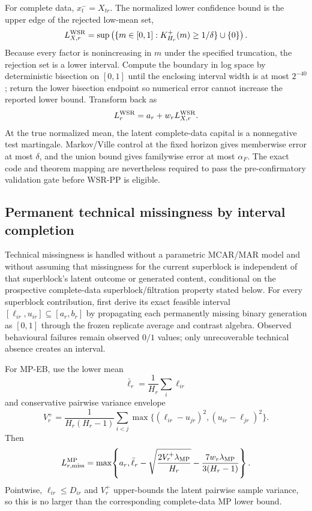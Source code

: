 \documentclass[11pt,a4paper]{article}
\begin{document}
For complete data, $x_t^-=X_{tr}$. The normalized lower confidence bound is the upper edge of the rejected low-mean set,
\[
L_{X,r}^{\rm WSR}
=\sup\left(\{m\in[0,1]:K_{H_r}^+(m)\ge1/\delta\}\cup\{0\}\right).
\]
Because every factor is nonincreasing in $m$ under the specified truncation, the rejection set is a lower interval. Compute the boundary in log space by deterministic bisection on $[0,1]$ until the enclosing interval width is at most $2^{-40}$; return the lower bisection endpoint so numerical error cannot increase the reported lower bound. Transform back as
\[
L_r^{\rm WSR}=a_r+w_rL_{X,r}^{\rm WSR}.
\]
At the true normalized mean, the latent complete-data capital is a nonnegative test martingale. Markov/Ville control at the fixed horizon gives memberwise error at most $\delta$, and the union bound gives familywise error at most $\alpha_F$. The exact code and theorem mapping are nevertheless required to pass the pre-confirmatory validation gate before WSR-PP is eligible.

\subsection{Permanent technical missingness by interval completion}\label{sec:missingness}
Technical missingness is handled without a parametric MCAR/MAR model and without assuming that missingness for the current superblock is independent of that superblock's latent outcome or generated content, conditional on the prospective complete-data superblock/filtration property stated below. For every superblock contribution, first derive its exact feasible interval $[\ell_{ir},u_{ir}]\subseteq[a_r,b_r]$ by propagating each permanently missing binary generation as $[0,1]$ through the frozen replicate average and contrast algebra. Observed behavioural failures remain observed $0/1$ values; only unrecoverable technical absence creates an interval.

For MP-EB, use the lower mean
\[
\bar\ell_r=\frac1{H_r}\sum_i\ell_{ir}
\]
and conservative pairwise variance envelope
\[
V_r^+=\frac{1}{H_r(H_r-1)}\sum_{i<j}
\max\{(\ell_{ir}-u_{jr})^2,(u_{ir}-\ell_{jr})^2\}.
\]
Then
\[
L_{r,\rm miss}^{\rm MP}
=\max\!\left\{a_r,
\bar\ell_r-\sqrt{\frac{2V_r^+\lambda_{\rm MP}}{H_r}}
-\frac{7w_r\lambda_{\rm MP}}{3(H_r-1)}\right\}.
\]
Pointwise, $\ell_{ir}\le D_{ir}$ and $V_r^+$ upper-bounds the latent pairwise sample variance, so this is no larger than the corresponding complete-data MP lower bound.
\end{document}
